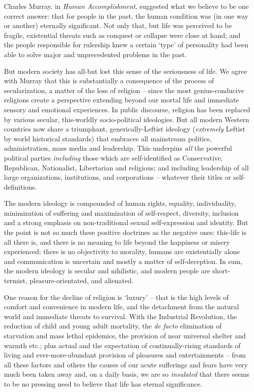 \documentclass[
]{book}
\begin{document}
Charles Murray, in \emph{Human Accomplishment}, suggested what we believe to be one correct answer: that for people in the past, the human condition was (in one way or another) eternally significant. Not only that, but life was perceived to be fragile, existential threats such as conquest or collapse were close at hand; and the people responsible for rulership knew a certain `type' of personality had been able to solve major and unprecedented problems in the past.

But modern society has all-but lost this sense of the seriousness of life. We agree with Murray that this is substantially a consequence of the process of secularization, a matter of the loss of religion -- since the most genius-conducive religions create a perspective extending beyond our mortal life and immediate sensory and emotional experiences. In public discourse, religion has been replaced by various secular, this-worldly socio-political ideologies. But all modern Western countries now share a triumphant, generically-Leftist ideology (\emph{extremely} Leftist by world historical standards) that embraces all mainstream politics, administration, mass media and leadership. This underpins \emph{all} the powerful political parties \emph{including} those which are self-identified as Conservative, Republican, Nationalist, Libertarian and religious; and including leadership of all large organizations, institutions, and corporations -- whatever their titles or self-definitions.

The modern ideology is compounded of human rights, equality, individuality, minimization of suffering and maximization of self-respect, diversity, inclusion and a strong emphasis on non-traditional sexual self-expression and identity. But the point is not so much these positive doctrines as the negative ones: this-life is all there is, and there is no meaning to life beyond the happiness or misery experienced; there is no objectivity to morality, humans are existentially alone and communication is uncertain and mostly a matter of self-deception. In sum, the modern ideology is secular and nihilistic, and modern people are short-termist, pleasure-orientated, and alienated.

One reason for the decline of religion is `luxury' -- that is the high levels of comfort and convenience in modern life, and the detachment from the natural world and immediate threats to survival. With the Industrial Revolution, the reduction of child and young adult mortality, the \emph{de facto} elimination of starvation and mass lethal epidemics, the provision of near universal shelter and warmth etc.; plus actual and the expectation of continually-rising standards of living and ever-more-abundant provision of pleasures and entertainments -- from all these factors and others the causes of our acute sufferings and fears have very much been taken away and, on a daily basis, we are so \emph{insulated} that there seems to be no pressing need to believe that life has eternal significance.
\end{document}
